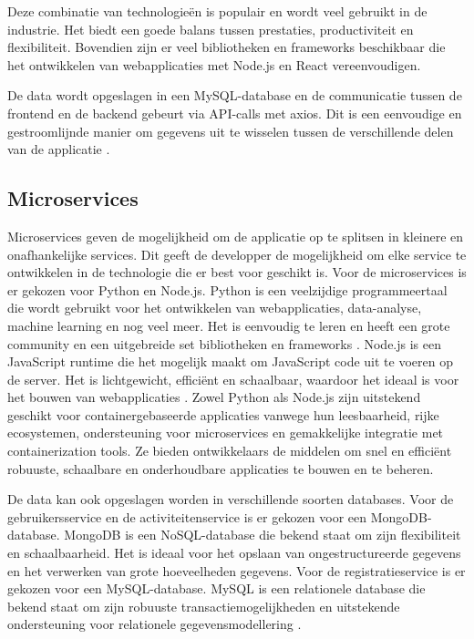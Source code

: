 Deze combinatie van technologieën is populair en wordt veel gebruikt in de industrie. Het biedt een goede balans tussen prestaties, productiviteit en flexibiliteit. Bovendien zijn er veel bibliotheken en frameworks beschikbaar die het ontwikkelen van webapplicaties met Node.js en React vereenvoudigen.

De data wordt opgeslagen in een MySQL-database en de communicatie tussen de frontend en de backend gebeurt via API-calls met axios. Dit is een eenvoudige en gestroomlijnde manier om gegevens uit te wisselen tussen de verschillende delen van de applicatie \autocite{MySQL} \autocite{Axios}. 

\subsection*{Microservices}
Microservices geven de mogelijkheid om de applicatie op te splitsen in kleinere en onafhankelijke services. Dit geeft de developper de mogelijkheid om elke service te ontwikkelen in de technologie die er best voor geschikt is. Voor de microservices is er gekozen voor Python en Node.js. Python is een veelzijdige programmeertaal die wordt gebruikt voor het ontwikkelen van webapplicaties, data-analyse, machine learning en nog veel meer. Het is eenvoudig te leren en heeft een grote community en een uitgebreide set bibliotheken en frameworks \autocite{Python}. Node.js is een JavaScript runtime die het mogelijk maakt om JavaScript code uit te voeren op de server. Het is lichtgewicht, efficiënt en schaalbaar, waardoor het ideaal is voor het bouwen van webapplicaties \autocite{Nodejs}. Zowel Python als Node.js zijn uitstekend geschikt voor containergebaseerde applicaties vanwege hun leesbaarheid, rijke ecosystemen, ondersteuning voor microservices en gemakkelijke integratie met containerization tools. Ze bieden ontwikkelaars de middelen om snel en efficiënt robuuste, schaalbare en onderhoudbare applicaties te bouwen en te beheren.


De data kan ook opgeslagen worden in verschillende soorten databases. Voor de gebruikersservice en de activiteitenservice is er gekozen voor een MongoDB- database. MongoDB is een NoSQL-database die bekend staat om zijn flexibiliteit en schaalbaarheid. Het is ideaal voor het opslaan van ongestructureerde gegevens en het verwerken van grote hoeveelheden gegevens. Voor de registratieservice is er gekozen voor een MySQL-database. MySQL is een relationele database die bekend staat om zijn robuuste transactiemogelijkheden en uitstekende ondersteuning voor relationele gegevensmodellering \autocite{MongoDB} \autocite{MySQL}.

